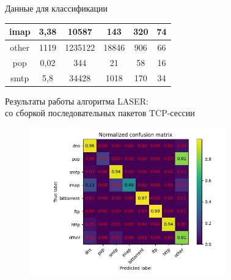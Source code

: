 \documentclass[10pt]{beamer}
\begin{document}
\begin{frame}[shrink=5]{Данные для классификации}
\begin{table}[]
{\begin{tabular}{|c|c|c|c|c|c|}
            imap       & 3,38       & 10587              & 143                & 320                              & 74                                  \\ \hline
            other      & 1119       & 1235122            & 18846              & 906                              & 66                                  \\ \hline
            pop        & 0,02       & 344                & 21                 & 58                               & 16                                  \\ \hline
            smtp       & 5,8        & 34428              & 1018               & 170                              & 34                                  \\ \hline
        \end{tabular}}
    \end{table}
\end{frame}

\begin{frame}{Результаты работы алгоритма LASER: \\ со сборкой последовательных пакетов TCP-сессии}
    \begin{figure}
        \begin{adjustwidth}{-2em}{-2em}
            \centering
            \includegraphics[width=23em]{results/laser_reasm/Normalized_confusion_matrix.png}
        \end{adjustwidth}
    \end{figure}
\end{frame}
\end{document}
